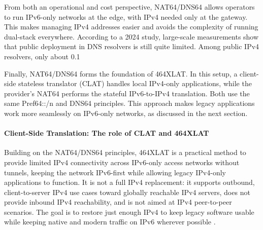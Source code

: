 From both an operational and cost perspective, NAT64/DNS64 allows operators to run IPv6-only networks at the edge, with IPv4 needed only at the gateway. This makes managing IPv4 addresses easier and avoids the complexity of running dual-stack everywhere. According to a 2024 study, large-scale measurements show that public deployment in DNS resolvers is still quite limited. Among public IPv4 resolvers, only about 0.1%

Finally, NAT64/DNS64 forms the foundation of 464XLAT. In this setup, a client-side stateless translator (CLAT) handles local IPv4-only applications, while the provider's NAT64 performs the stateful IPv6-to-IPv4 translation. Both use the same Pref64::/n and DNS64 principles. This approach makes legacy applications work more seamlessly on IPv6-only networks, as discussed in the next section\cite{6231295}.

\paragraph{Client-Side Translation: The role of CLAT and 464XLAT} 


Building on the NAT64/DNS64 principles, 464XLAT is a practical method to provide limited IPv4 connectivity across IPv6-only access networks without tunnels, keeping the network IPv6-first while allowing legacy IPv4-only applications to function. It is not a full IPv4 replacement: it supports outbound, client-to-server IPv4 use cases toward globally reachable IPv4 servers, does not provide inbound IPv4 reachability, and is not aimed at IPv4 peer-to-peer scenarios. The goal is to restore just enough IPv4 to keep legacy software usable while keeping native and modern traffic on IPv6 wherever possible \cite{rfc6877}.

